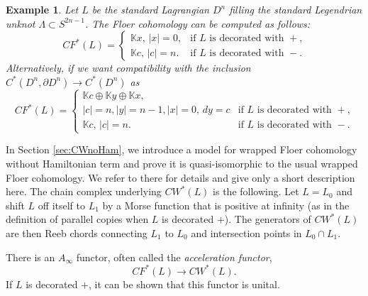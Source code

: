 \documentclass{gtpart}
\newtheorem{ex}[thm]{Example}
\begin{document}
\begin{ex} Let $L$ be the standard Lagrangian $D^n$ filling the standard Legendrian unknot $\Lambda
    \subset S^{2n-1}$. The Floer cohomology can be computed as follows:
\[ 
CF^*(L) =
\begin{cases}
\mathbb{K}x,\, |x|=0, &\text{if $L$ is decorated with $+$,}\\
\mathbb{K}c,\, |c|=n.   & \text{if $L$ is decorated with $-$.}
\end{cases}
\]
Alternatively, if we want compatibility with the inclusion $C^{\ast}(D^{n},\partial D^{n})\to C^{\ast}(D^{n})$ as
\[ 
CF^*(L) =
\begin{cases}
\mathbb{K}c \oplus \mathbb{K} y \oplus \mathbb{K} x,\\ 
|c|=n, |y|=n-1, |x|=0,\,
dy =c &\text{if $L$ is decorated with $+$,}\\
\mathbb{K}c,\, |c|=n.   & \text{if $L$ is decorated with $-$.}
\end{cases}
\]
\end{ex}

In Section \ref{sec:CWnoHam}, we introduce a model for wrapped Floer cohomology without Hamiltonian term and
prove it is quasi-isomorphic to the usual wrapped Floer cohomology. We refer to there for details
and give only a short description here. The chain complex underlying $CW^{\ast}(L)$ is the
following. Let $L=L_0$ and shift $L$ off itself to $L_{1}$ by a Morse function that is positive at
infinity (as in the definition of parallel copies when $L$ is decorated $+$). The generators of $CW^{\ast}(L)$ are then Reeb chords connecting $L_{1}$ to $L_{0}$ and intersection points in $L_{0}\cap L_{1}$.

There is an $A_\infty$ functor, often called the \emph{acceleration functor}, 
\[ CF^*(L) \to CW^*(L). \]
If $L$ is decorated $+$, it can be shown that this functor is unital. 


%
\end{document}

